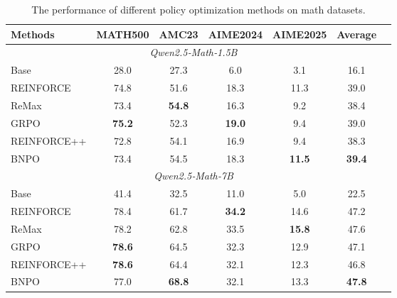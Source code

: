 \documentclass{article}
\theoremstyle{plain}
\theoremstyle{definition}
\theoremstyle{remark}
\begin{document}
\begin{table}[t]
    \centering
    \caption{The performance of different policy optimization methods on math datasets.}
    \label{table:1}
    \begin{tabular}{lcccccc}
        \toprule
        \textbf{Methods} & \textbf{MATH500} & \textbf{AMC23} & \textbf{AIME2024} & \textbf{AIME2025} & \textbf{Average}\\
        \midrule
        \multicolumn{6}{c}{\textit{Qwen2.5‑Math‑1.5B}} \\
        \midrule
        Base                                    & 28.0 & 27.3 & 6.0  & 3.1  &16.1 \\
        REINFORCE                               & 74.8 & 51.6 & 18.3  & 11.3  &39.0 \\
        ReMax                                   & 73.4 & \textbf{54.8} & 16.3  & 9.2  &38.4 \\
        GRPO                                    & \textbf{75.2} & 52.3 & \textbf{19.0}  & 9.4  &39.0 \\
        REINFORCE++                             & 72.8 & 54.1 & 16.9  & 9.4  &38.3\\
        BNPO                                    & 73.4 &54.5 & 18.3  & \textbf{11.5}  &\textbf{39.4} \\
        \midrule
        \multicolumn{6}{c}{\textit{Qwen2.5‑Math‑7B}}  \\
        \midrule
        Base                                    & 41.4 & 32.5 & 11.0  & 5.0   &22.5 \\
        REINFORCE                               & 78.4 & 61.7 & \textbf{34.2}  & 14.6   &47.2 \\
        ReMax                                   & 78.2 & 62.8 & 33.5 & \textbf{15.8}   &47.6 \\
        GRPO                                    & \textbf{78.6} & 64.5 & 32.3  & 12.9   &47.1 \\
        REINFORCE++                             & \textbf{78.6} & 64.4 & 32.1  & 12.3   &46.8 \\
        BNPO                                    & 77.0 & \textbf{68.8} & 32.1 & 13.3  &\textbf{47.8} \\
        \bottomrule
    \end{tabular}
\end{table}
\end{document}
